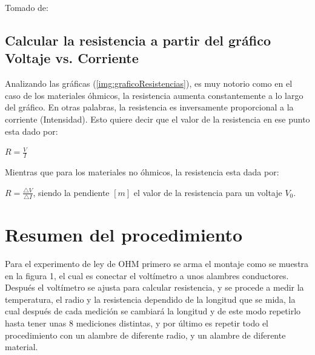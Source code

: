 \documentclass[letterpaper, 12pt]{report}
\begin{document}
Tomado de:~\cite{GraficaVoltajeCorriente}

\subsection{Calcular la resistencia a partir del gráfico Voltaje vs.\hfill{}
	\break{} Corriente}

Analizando las gráficas (\ref{img:graficoResistencias}), es muy notorio como 
en el caso de los materiales óhmicos, la resistencia aumenta constantemente 
a lo largo del gráfico. En otras palabras, la resistencia es inversamente 
proporcional a la corriente (Intensidad). Esto quiere decir que el valor de 
la resistencia en ese punto esta dado por:

$R = \frac{V}{I}$

\vspace{.5cm}

Mientras que para los materiales no óhmicos, la resistencia esta
dada por:

$R = \frac{\triangle V}{\triangle I}$, siendo la pendiente $[m]$ el valor
de la resistencia para un voltaje $V_0$.

\section{Resumen del procedimiento}

Para el experimento de ley de OHM primero se arma el montaje como se muestra 
en la figura 1, el cual es  conectar el voltímetro a unos alambres conductores. 
Después el voltímetro se ajusta para calcular resistencia, y se procede a medir 
la temperatura, el radio y la resistencia dependido de la longitud que se mida, 
la cual después de cada medición se cambiará la longitud y de este modo 
repetirlo hasta tener unas 8 mediciones distintas, y por último es repetir 
todo el procedimiento con un alambre de diferente radio, y un alambre de 
diferente material.

\newpage

\end{document}
